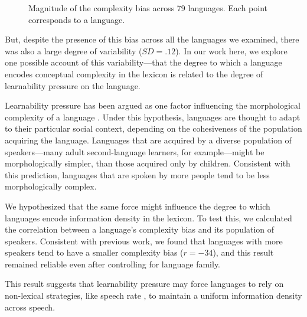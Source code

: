 \documentclass{evolang11}
\begin{document}
\begin{figure}[hb]
\begin{center}
\end{center}
\caption{Magnitude of the complexity bias across 79 languages. Each point corresponds to a language. \label{fig1}}
\end{figure}

But, despite the presence of this bias across all the languages we examined, there was also a large degree of variability ($SD = .12$). In our work here, we explore one possible account of this variability---that the degree to which a language encodes conceptual complexity in the lexicon is related to the degree of learnability pressure on the language.

Learnability pressure has been argued as one factor influencing the morphological complexity of a language \cite{lupyan2010language}. Under this hypothesis, languages are thought to adapt to their particular social context, depending on the cohesiveness of the population acquiring the language. Languages that are  acquired by a diverse population of speakers---many  adult second-language learners, for example---might be morphologically simpler, than those acquired only by children. Consistent with this prediction, languages that are spoken by more people tend to be less morphologically complex.

We hypothesized that the same force might influence the degree to which languages encode information density in the lexicon. To test this, we calculated the correlation between a language's complexity bias and its population of speakers. Consistent with previous work, we found that languages with more speakers tend to have a smaller complexity bias ($r = -34$), and this result remained reliable even after controlling for language family.

This result suggests that learnability pressure may force languages to rely on non-lexical strategies, like speech rate \cite{pellegrino2011across}, to maintain a uniform information density across speech.
\end{document}
